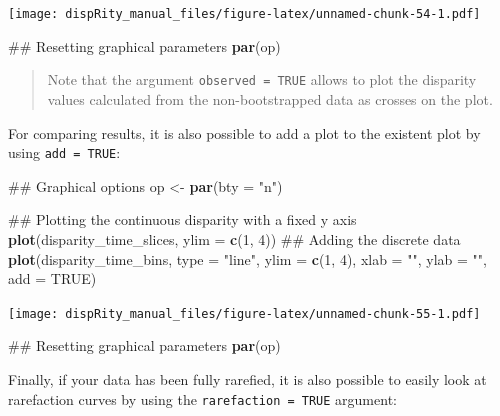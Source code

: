 \documentclass[]{book}
\newenvironment{Shaded}{\begin{snugshade}}{\end{snugshade}}
\newcommand{\KeywordTok}[1]{\textcolor[rgb]{0.13,0.29,0.53}{\textbf{#1}}}
\newcommand{\DataTypeTok}[1]{\textcolor[rgb]{0.13,0.29,0.53}{#1}}
\newcommand{\DecValTok}[1]{\textcolor[rgb]{0.00,0.00,0.81}{#1}}
\newcommand{\StringTok}[1]{\textcolor[rgb]{0.31,0.60,0.02}{#1}}
\newcommand{\OtherTok}[1]{\textcolor[rgb]{0.56,0.35,0.01}{#1}}
\newcommand{\NormalTok}[1]{#1}
\theoremstyle{definition}
\theoremstyle{definition}
\theoremstyle{remark}
\begin{document}
\texttt{[image: dispRity\_manual\_files/figure-latex/unnamed-chunk-54-1.pdf]}

\begin{Shaded}
\begin{Highlighting}[]
\NormalTok{## Resetting graphical parameters}
\KeywordTok{par}\NormalTok{(op)}
\end{Highlighting}
\end{Shaded}

\begin{quote}
Note that the argument \texttt{observed\ =\ TRUE} allows to plot the
disparity values calculated from the non-bootstrapped data as crosses on
the plot.
\end{quote}

For comparing results, it is also possible to add a plot to the existent
plot by using \texttt{add\ =\ TRUE}:

\begin{Shaded}
\begin{Highlighting}[]
\NormalTok{## Graphical options}
\NormalTok{op <-}\StringTok{ }\KeywordTok{par}\NormalTok{(}\DataTypeTok{bty =} \StringTok{"n"}\NormalTok{)}

\NormalTok{## Plotting the continuous disparity with a fixed y axis}
\KeywordTok{plot}\NormalTok{(disparity_time_slices, }\DataTypeTok{ylim =} \KeywordTok{c}\NormalTok{(}\DecValTok{1}\NormalTok{, }\DecValTok{4}\NormalTok{))}
\NormalTok{## Adding the discrete data}
\KeywordTok{plot}\NormalTok{(disparity_time_bins, }\DataTypeTok{type =} \StringTok{"line"}\NormalTok{, }\DataTypeTok{ylim =} \KeywordTok{c}\NormalTok{(}\DecValTok{1}\NormalTok{, }\DecValTok{4}\NormalTok{), }\DataTypeTok{xlab =} \StringTok{""}\NormalTok{, }\DataTypeTok{ylab =} \StringTok{""}\NormalTok{,}
    \DataTypeTok{add =} \OtherTok{TRUE}\NormalTok{)}
\end{Highlighting}
\end{Shaded}

\texttt{[image: dispRity\_manual\_files/figure-latex/unnamed-chunk-55-1.pdf]}

\begin{Shaded}
\begin{Highlighting}[]
\NormalTok{## Resetting graphical parameters}
\KeywordTok{par}\NormalTok{(op)}
\end{Highlighting}
\end{Shaded}

Finally, if your data has been fully rarefied, it is also possible to
easily look at rarefaction curves by using the
\texttt{rarefaction\ =\ TRUE} argument:
\end{document}
